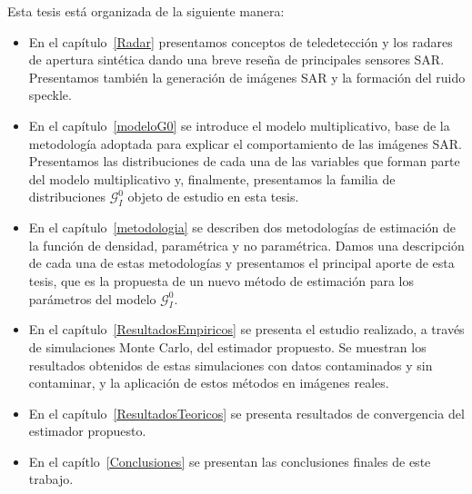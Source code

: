 Esta tesis está organizada de la siguiente manera:
\begin{itemize}
	\item En el capítulo~\ref{Radar} presentamos conceptos de teledetección y los radares de apertura sintética dando una breve reseña de principales sensores SAR. Presentamos también la generación de imágenes SAR y  la formación del ruido speckle.
	\item En el capítulo~\ref{modeloG0} se introduce el modelo multiplicativo, base de la metodología adoptada para explicar el comportamiento de las imágenes SAR. Presentamos las distribuciones de cada una de las variables que forman parte del modelo multiplicativo y, finalmente, presentamos la familia de distribuciones $\mathcal{G}_I^0$ objeto de estudio en esta tesis.
	\item En el capítulo~\ref{metodologia}  se describen dos metodologías de estimación de la función de densidad, paramétrica y no paramétrica. Damos una descripción de cada una de estas metodologías y presentamos el principal aporte de esta tesis, que es la propuesta de un nuevo método de estimación para los parámetros del modelo $\mathcal G_I^0$.
	\item En el capítulo~\ref{ResultadosEmpiricos} se presenta el estudio realizado, a través de simulaciones Monte Carlo, del estimador propuesto. Se muestran los resultados obtenidos de estas simulaciones  con datos contaminados y sin contaminar, y la aplicación de estos métodos en imágenes reales.
	\item En el capítulo~\ref{ResultadosTeoricos} se presenta resultados de convergencia del estimador propuesto.
	\item En el capítlo~\ref{Conclusiones} se presentan las conclusiones finales de este trabajo.
	
\end{itemize}